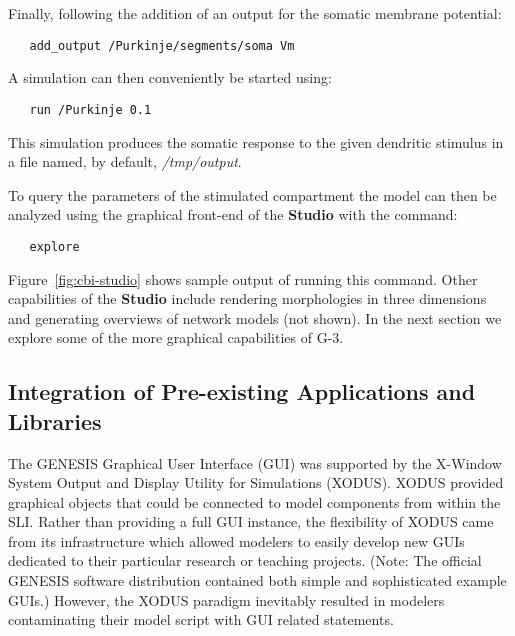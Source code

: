 \documentclass[10pt]{article}
\begin{document}
Finally, following the addition of an output for the somatic membrane potential:
\begin{verbatim}
   add_output /Purkinje/segments/soma Vm
\end{verbatim}
A simulation can then conveniently be started using:
\begin{verbatim}
   run /Purkinje 0.1
\end{verbatim}
This simulation produces the somatic response to the given dendritic stimulus in a file named, by default, {\it /tmp/output}.

To query the parameters of the stimulated compartment the model can
then be analyzed using the graphical front-end of the {\bf Studio}
with the command:

\begin{verbatim}
   explore
\end{verbatim}


Figure~\ref{fig:cbi-studio} shows sample output of running this
command.  Other capabilities of the {\bf Studio} include rendering
morphologies in three dimensions and generating overviews of network
models (not shown).  In the next section we explore some of the more graphical
capabilities of G-3.

\subsection*{Integration of Pre-existing Applications and Libraries}

The GENESIS Graphical User Interface (GUI) was supported by the
X-Window System Output and Display Utility for Simulations (XODUS).
XODUS provided graphical objects that could be
connected to model components from within the SLI.  Rather than
providing a full GUI instance, the flexibility of XODUS came from its
infrastructure which allowed modelers to easily develop new GUIs
dedicated to their particular research or teaching projects. (Note: The
  official GENESIS software distribution contained both simple and
  sophisticated example GUIs.)  However, the XODUS paradigm
inevitably resulted in modelers contaminating their model script with GUI
related statements.
\end{document}
